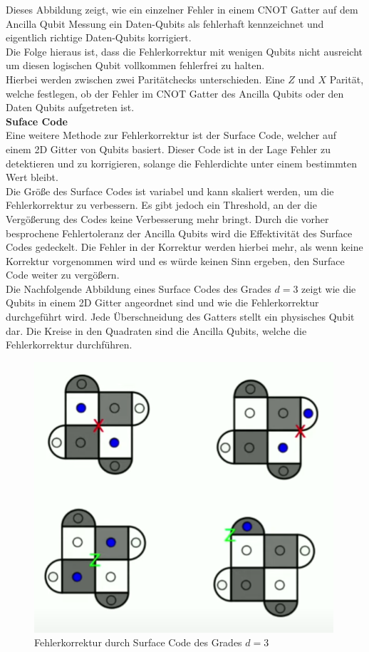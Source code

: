 Dieses Abbildung zeigt, wie ein einzelner Fehler in einem CNOT Gatter auf dem Ancilla Qubit Messung ein Daten-Qubits als fehlerhaft kennzeichnet und eigentlich richtige Daten-Qubits korrigiert.\\
Die Folge hieraus ist, dass die Fehlerkorrektur mit wenigen Qubits nicht ausreicht um diesen logischen Qubit vollkommen fehlerfrei zu halten.\\

Hierbei werden zwischen zwei Paritätchecks unterschieden. Eine $Z$ und $X$ Parität, welche festlegen, ob der Fehler im CNOT Gatter des Ancilla Qubits oder den Daten Qubits aufgetreten ist.\\

\textbf{Suface Code}\\
Eine weitere Methode zur Fehlerkorrektur ist der Surface Code, welcher auf einem 2D Gitter von Qubits basiert.
Dieser Code ist in der Lage Fehler zu detektieren und zu korrigieren, solange die Fehlerdichte unter einem bestimmten Wert bleibt.\\

Die Größe des Surface Codes ist variabel und kann skaliert werden, um die Fehlerkorrektur zu verbessern.
Es gibt jedoch ein Threshold, an der die Vergößerung des Codes keine Verbesserung mehr bringt.
Durch die vorher besprochene Fehlertoleranz der Ancilla Qubits wird die Effektivität des Surface Codes gedeckelt.
Die Fehler in der Korrektur werden hierbei mehr, als wenn keine Korrektur vorgenommen wird und es würde keinen Sinn ergeben, den Surface Code weiter zu vergößern.\\

Die Nachfolgende Abbildung eines Surface Codes des Grades $d=3$ zeigt wie die Qubits in einem 2D Gitter angeordnet sind und wie die Fehlerkorrektur durchgeführt wird.
Jede Überschneidung des Gatters stellt ein physisches Qubit dar. Die Kreise in den Quadraten sind die Ancilla Qubits, welche die Fehlerkorrektur durchführen.\\

\begin{figure}[H]
    \centering
    \includegraphics[width=0.6\linewidth]{img/Errors.png}
    \caption{Fehlerkorrektur durch Surface Code des Grades $d=3$ \cite[5m]{qutech_academy_quantum_2018}}
    \label{fig:Surface-Code}
\end{figure}

